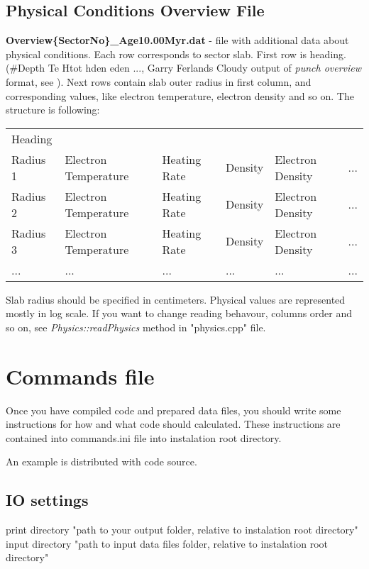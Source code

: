 \documentclass[a4paper]{article}
\begin{document}
\subsection{Physical Conditions Overview File}
\label{dataOverview}
{\bf Overview\{SectorNo\}\_Age10.00Myr.dat} - file with additional data about physical conditions. Each row
corresponds to sector slab. First row is heading.
(\#Depth		Te	Htot hden eden ..., Garry Ferlands Cloudy output of {\it punch overview}
format, see \cite{Cloudy}).
Next rows contain slab outer radius in first column,
and corresponding values, like electron temperature, electron density and so on.
The structure is following:
\begin{table}[H]
    \begin{tabular}{llllll}
        Heading & & & & & \\
        Radius 1 & Electron Temperature & Heating Rate & Density & Electron Density & ... \\
        Radius 2 & Electron Temperature & Heating Rate & Density & Electron Density & ... \\
        Radius 3 & Electron Temperature & Heating Rate & Density & Electron Density & ... \\
        ... & ... & ... & ... & ... & ... \\
    \end{tabular}
\end{table}
Slab radius should be specified in centimeters. Physical values are represented mostly in log scale.
If you want to change reading behavour, columns order and so on, see {\it Physics::readPhysics} method in "physics.cpp" file.


\section{Commands file}

Once you have compiled code and prepared data files, you should write some 
instructions for how and what code should calculated. These instructions are 
contained into commands.ini file into instalation root directory. 

An example is distributed with code source. \\

\subsection{IO settings}
print directory "path to your output folder, relative to instalation root directory"\\
input directory "path to input data files folder, relative to instalation root directory"\\
\end{document}
